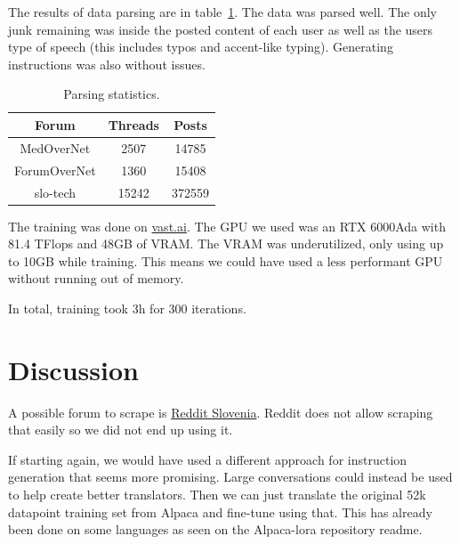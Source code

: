 \documentclass[fleqn,moreauthors,10pt]{ds_report}
\begin{document}
The results of data parsing are in table~\ref{tab:parse}. The data was parsed well. The only junk remaining was inside the posted content of each user as well as the users type of speech (this includes typos and accent-like typing). Generating instructions was also without issues.

\begin{table}[hbt]
	\caption{Parsing statistics.}
	\centering
	\begin{tabular}{c|c|c}
		\toprule
		Forum & Threads & Posts \\
		\midrule
		MedOverNet & 2507 & 14785 \\
		  ForumOverNet & 1360 & 15408 \\
		  slo-tech & 15242 & 372559 \\
		\bottomrule
	\end{tabular}
	\label{tab:parse}
\end{table}

The training was done on \href{https://cloud.vast.ai/create/}{vast.ai}. The GPU we used was an RTX 6000Ada with 81.4 TFlops and 48GB of VRAM. The VRAM was underutilized, only using up to 10GB while training. This means we could have used a less performant GPU without running out of memory.

In total, training took 3h for 300 iterations.

\section*{Discussion}

A possible forum to scrape is \href{https://www.reddit.com/r/Slovenia/}{Reddit Slovenia}. Reddit does not allow scraping that easily so we did not end up using it.

If starting again, we would have used a different approach for instruction generation that seems more promising. Large conversations could instead be used to help create better translators. Then we can just translate the original 52k datapoint training set from Alpaca and fine-tune using that. This has already been done on some languages as seen on the Alpaca-lora repository readme.
\end{document}
